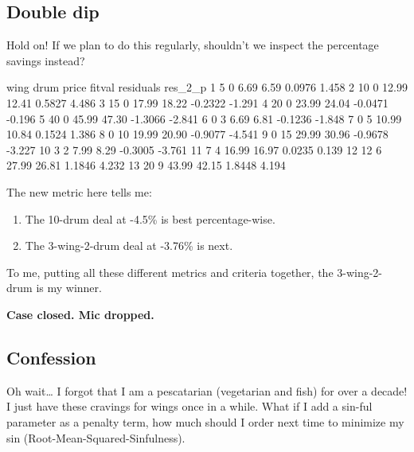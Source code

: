 \documentclass[
]{article}
\newenvironment{Shaded}{\begin{snugshade}}{\end{snugshade}}
\newcommand{\DecValTok}[1]{\textcolor[rgb]{0.00,0.00,0.81}{#1}}
\newcommand{\NormalTok}[1]{#1}
\newcommand{\OtherTok}[1]{\textcolor[rgb]{0.56,0.35,0.01}{#1}}
\newcommand{\SpecialCharTok}[1]{\textcolor[rgb]{0.00,0.00,0.00}{#1}}
\providecommand{\tightlist}{%
  \setlength{\itemsep}{0pt}\setlength{\parskip}{0pt}}
\begin{document}
\hypertarget{double-dip}{%
\subsection{Double dip}\label{double-dip}}

Hold on! If we plan to do this regularly, shouldn't we inspect the
percentage savings instead?

\begin{Shaded}
\end{Shaded}

wing drum price fitval residuals res\_2\_p 1 5 0 6.69 6.59 0.0976 1.458
2 10 0 12.99 12.41 0.5827 4.486 3 15 0 17.99 18.22 -0.2322 -1.291 4 20 0
23.99 24.04 -0.0471 -0.196 5 40 0 45.99 47.30 -1.3066 -2.841 6 0 3 6.69
6.81 -0.1236 -1.848 7 0 5 10.99 10.84 0.1524 1.386 8 0 10 19.99 20.90
-0.9077 -4.541 9 0 15 29.99 30.96 -0.9678 -3.227 10 3 2 7.99 8.29
-0.3005 -3.761 11 7 4 16.99 16.97 0.0235 0.139 12 12 6 27.99 26.81
1.1846 4.232 13 20 9 43.99 42.15 1.8448 4.194

The new metric here tells me:

\begin{enumerate}
\def\labelenumi{\arabic{enumi}.}
\tightlist
\item
  The 10-drum deal at -4.5\% is best percentage-wise.
\item
  The 3-wing-2-drum deal at -3.76\% is next.
\end{enumerate}

To me, putting all these different metrics and criteria together, the
3-wing-2-drum is my winner.

\textbf{Case closed. Mic dropped.}

\hypertarget{confession}{%
\subsection{Confession}\label{confession}}

Oh wait\ldots{} I forgot that I am a pescatarian (vegetarian and fish)
for over a decade! I just have these cravings for wings once in a while.
What if I add a sin-ful parameter as a penalty term, how much should I
order next time to minimize my sin (Root-Mean-Squared-Sinfulness).
\end{document}
